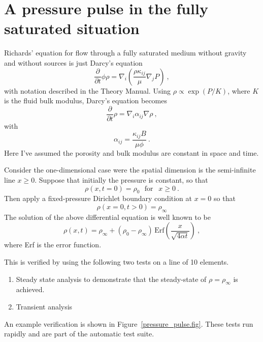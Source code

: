 \documentclass[]{scrreprt}
\begin{document}
\chapter{A pressure pulse in the fully saturated situation}
\label{pp}

Richards' equation for flow through a fully saturated medium without
gravity and without sources is just Darcy's equation
\begin{equation}
\frac{\partial}{\partial t}\phi\rho = \nabla_{i}\left(\frac{\rho
  \kappa_{ij}}{\mu} \nabla_{j}P \right) \ ,
\end{equation}
with notation described in the Theory Manual.  Using $\rho \propto
\exp(P/K)$, where $K$ is the fluid bulk modulus, Darcy's equation
becomes
\begin{equation}
\frac{\partial}{\partial t}\rho = \nabla_{i}\alpha_{ij}\nabla\rho \ ,
\end{equation}
with 
\begin{equation}
\alpha_{ij} = \frac{\kappa_{ij}B}{\mu\phi} \ .
\end{equation}
Here I've assumed the porosity and bulk modulus are constant in space
and time.

Consider the one-dimensional case were the spatial dimension is the
semi-infinite line $x\geq 0$.  Suppose that initially the pressure is
constant, so that
\begin{equation}
\rho(x, t=0) = \rho_{0} \ \ \ \mbox{for }\ \ x\geq 0 \ .
\end{equation}
Then apply a fixed-pressure Dirichlet boundary condition at $x=0$ so
that
\begin{equation}
\rho(x=0, t>0) = \rho_{\infty}
\end{equation}
The solution of the above differential equation is well known to be
\begin{equation}
\rho(x, t) = \rho_{\infty} + (\rho_{0} -
\rho_{\infty})\,\mbox{Erf}\left( \frac{x}{\sqrt{4\alpha t}} \right) \ ,
\label{eqn.exact.pp}
\end{equation}
where Erf is the error function.

This is verified by using the following two tests on a line of
10 elements.
\begin{enumerate}
\item Steady state analysis to demonstrate that the
  steady-state of $\rho = \rho_{\infty}$ is achieved.
\item Transient analysis
\end{enumerate}
An example verification is shown in Figure~\ref{pressure_pulse.fig}.
These tests run rapidly and are part of the automatic test suite.
\end{document}
